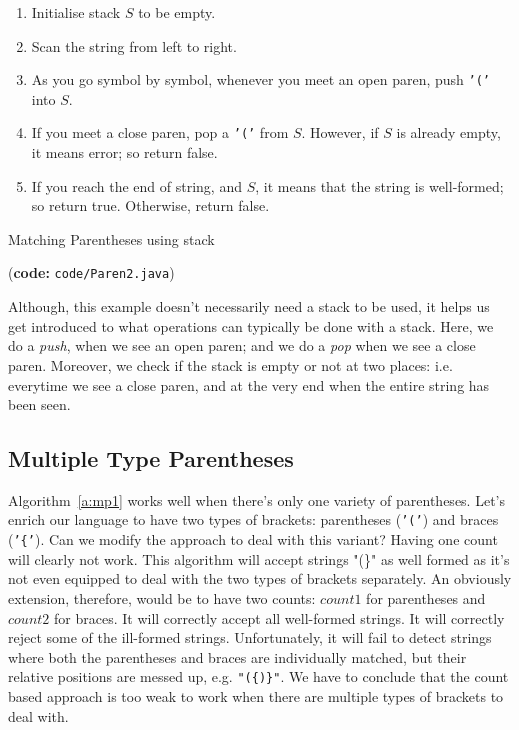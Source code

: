 \documentclass[12pt,a4paper]{article}
\begin{document}
\begin{algorithm}
\begin{enumerate}
\item Initialise stack $S$ to be empty.
\item Scan the string from left to right.
\item As you go symbol by symbol, whenever you meet an open paren, push \texttt{'('} into $S$.
\item If you meet a close paren, pop a \texttt{'('} from $S$. However, if $S$ is already empty, it means error; so return false.
\item If you reach the end of string, and $S$, it means that the string is well-formed; so return true. Otherwise, return false. 
\end{enumerate}
\caption{Matching Parentheses using stack}
\label{a:mp2}
\end{algorithm}

(\textbf{code:} \texttt{code/Paren2.java})

Although, this example doesn't necessarily need a stack to be used, it helps us get introduced to what operations can typically be done with a stack. Here, we do a \emph{push}, when we see an open paren; and we do a \emph{pop} when we see a close paren. Moreover, we check if the stack is empty or not at two places: i.e. everytime we see a close paren, and at the very end when the entire string has been seen.

\subsection{Multiple Type Parentheses}
Algorithm~\ref{a:mp1} works well when there's only one variety of parentheses. Let's enrich our language to have two types of brackets: parentheses (\texttt{'('}) and braces (\texttt{'\{'}). Can we modify the approach to deal with this variant? Having one count will clearly not work. This algorithm will accept strings "(\}" as well formed as it's not even equipped to deal with the two types of brackets separately. An obviously extension, therefore, would be to have two counts: $count1$ for parentheses and $count2$ for braces. It will correctly accept all well-formed strings. It will correctly reject some of the ill-formed strings. Unfortunately, it will fail to detect strings where both the parentheses and braces are individually matched, but their relative positions are messed up, e.g. \texttt{"(\{)\}"}. We have to conclude that the count based approach is too weak to work when there are multiple types of brackets to deal with.
\end{document}
